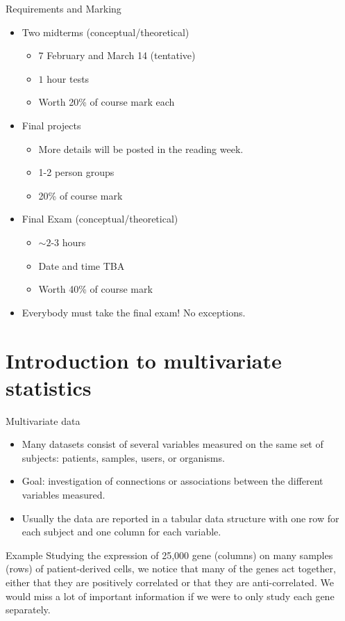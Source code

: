 \documentclass[11pt,handout,aspectratio=169]{beamer}
\begin{document}
\begin{frame}{Requirements and Marking}
\begin{itemize}
  \item Two midterms (conceptual/theoretical)
    \begin{itemize}
    \item 7 February and March 14 (tentative)
    \item $1$ hour tests 
    \item Worth 20\% of course mark each
    \end{itemize}
  \item Final projects
  \begin{itemize}
  	\item More details will be posted in the reading week.
  	\item 1-2 person groups
  	\item 20\% of course mark
  \end{itemize}
  \item Final Exam (conceptual/theoretical)
    \begin{itemize}
    \item $\sim 2$-$3$ hours
    \item Date and time TBA
    \item Worth 40\% of course mark
    \end{itemize}
    \item \alert{Everybody must take the final exam! No exceptions.}
  \end{itemize}
\end{frame}


\section{Introduction to multivariate statistics}

\begin{frame}{Multivariate data}
	\begin{itemize}
		\item Many datasets consist of several variables measured on the same set of subjects: patients, samples, users, or organisms.
		\item Goal: investigation of connections or associations between the different variables measured.
		\item Usually the data are reported in a tabular data structure with one row for each subject and one column for each variable.  
	\end{itemize}
	\begin{exampleblock}{Example}
	Studying the expression of 25{,}000 gene (columns) on many samples (rows) of patient-derived cells, we notice that many of the genes act together, either that they are positively correlated or that they are anti-correlated. We would miss a lot of important information if we were to only study each gene separately.	
	\end{exampleblock}
\end{frame}
\end{document}
